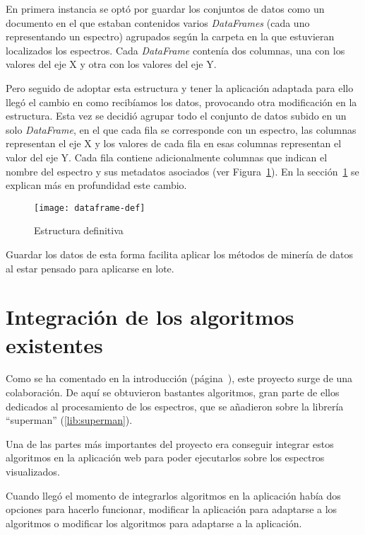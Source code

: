 En primera instancia se optó por guardar los conjuntos de datos como un
documento en el que estaban contenidos varios \textit{DataFrames} (cada uno
representando un espectro) agrupados según la carpeta en la que estuvieran
localizados los espectros. Cada \textit{DataFrame} contenía dos columnas, una
con los valores del eje X y otra con los valores del eje Y.

Pero seguido de adoptar esta estructura y tener la aplicación adaptada para ello
llegó el cambio en como recibíamos los datos, provocando otra modificación en la
estructura. Esta vez se decidió agrupar todo el conjunto de datos subido en un
solo \textit{DataFrame}, en el que cada fila se corresponde con un espectro, las
columnas representan el eje X y los valores de cada fila en esas columnas
representan el valor del eje Y. Cada fila contiene adicionalmente columnas que
indican el nombre del espectro y sus metadatos asociados (ver
Figura~\ref{fig:dataframe-def}). En la sección~\ref{sec:integracion} se explican
más en profundidad este cambio.

\begin{figure}[!h]
	\centering
	\texttt{[image: dataframe-def]}
	\caption{Estructura definitiva}\label{fig:dataframe-def}
\end{figure}

Guardar los datos de esta forma facilita aplicar los métodos de minería de datos
al estar pensado para aplicarse en lote.


\section{Integración de los algoritmos existentes}\label{sec:integracion}

Como se ha comentado en la introducción (página~\pageref{ch:introduccion}), este
proyecto surge de una colaboración. De aquí se obtuvieron bastantes algoritmos,
gran parte de ellos dedicados al procesamiento de los espectros, que se
añadieron sobre la librería ``superman'' (\ref{lib:superman}).

Una de las partes más importantes del proyecto era conseguir integrar estos
algoritmos en la aplicación web para poder ejecutarlos sobre los espectros
visualizados.

Cuando llegó el momento de integrarlos algoritmos en la aplicación había dos
opciones para hacerlo funcionar, modificar la aplicación para adaptarse a los
algoritmos o modificar los algoritmos para adaptarse a la aplicación.

